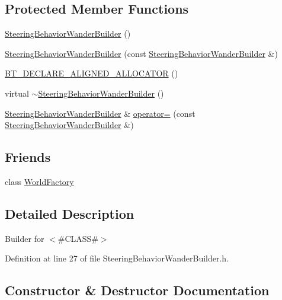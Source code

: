 \subsection*{Protected Member Functions}
\begin{DoxyCompactItemize}
\item 
\mbox{\hyperlink{classnjli_1_1_steering_behavior_wander_builder_a199d560226c74ab95100c70cdc8e503e}{Steering\+Behavior\+Wander\+Builder}} ()
\item 
\mbox{\hyperlink{classnjli_1_1_steering_behavior_wander_builder_a9ca5ddaca643131e91820af9808b5f1f}{Steering\+Behavior\+Wander\+Builder}} (const \mbox{\hyperlink{classnjli_1_1_steering_behavior_wander_builder}{Steering\+Behavior\+Wander\+Builder}} \&)
\item 
\mbox{\hyperlink{classnjli_1_1_steering_behavior_wander_builder_aebd948a1abbf2256e73b424779a746c1}{B\+T\+\_\+\+D\+E\+C\+L\+A\+R\+E\+\_\+\+A\+L\+I\+G\+N\+E\+D\+\_\+\+A\+L\+L\+O\+C\+A\+T\+OR}} ()
\item 
virtual \mbox{\hyperlink{classnjli_1_1_steering_behavior_wander_builder_abea1ef7c6a62f1c32db456e4cbce355e}{$\sim$\+Steering\+Behavior\+Wander\+Builder}} ()
\item 
\mbox{\hyperlink{classnjli_1_1_steering_behavior_wander_builder}{Steering\+Behavior\+Wander\+Builder}} \& \mbox{\hyperlink{classnjli_1_1_steering_behavior_wander_builder_ae2dbbe26cf42c66996087e60458fab70}{operator=}} (const \mbox{\hyperlink{classnjli_1_1_steering_behavior_wander_builder}{Steering\+Behavior\+Wander\+Builder}} \&)
\end{DoxyCompactItemize}
\subsection*{Friends}
\begin{DoxyCompactItemize}
\item 
class \mbox{\hyperlink{classnjli_1_1_steering_behavior_wander_builder_acb96ebb09abe8f2a37a915a842babfac}{World\+Factory}}
\end{DoxyCompactItemize}


\subsection{Detailed Description}
Builder for $<$\#\+C\+L\+A\+SS\#$>$ 

Definition at line 27 of file Steering\+Behavior\+Wander\+Builder.\+h.



\subsection{Constructor \& Destructor Documentation}
\mbox{\label{classnjli_1_1_steering_behavior_wander_builder_a199d560226c74ab95100c70cdc8e503e}} 
